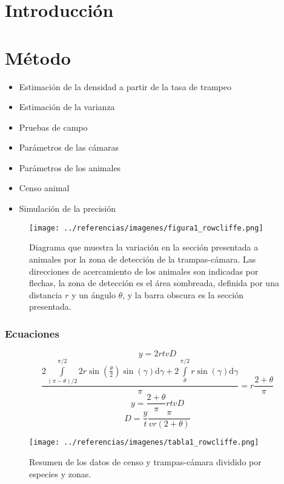 \section{Introducción}
\section{M\'etodo}
\begin{frame}
\begin{itemize}
  \item Estimaci\'on de la densidad a partir de la tasa de trampeo
  \item Estimaci\'on de la varianza
  \item Pruebas de campo
  \item Par\'ametros de las c\'amaras
  \item Par\'ametros de los animales
  \item Censo animal
  \item Simulaci\'on de la precisi\'on
\end{itemize}
\end{frame}
\begin{frame}
\begin{figure}[h]
\centering
\texttt{[image: ../referencias/imagenes/figura1\_rowcliffe.png]}
\caption{Diagrama que muestra la variaci\'on en la secci\'on presentada a
animales por la zona de detecci\'on de la trampas-c\'amara. Las direcciones de
acercamiento de los animales son indicadas por flechas, la zona de detecci\'on
es el \'area sombreada, definida por una distancia $r$ y un \'angulo $\theta$, y
la barra obscura es la secci\'on presentada.}
\end{figure}
\end{frame}
\begin{frame}
\frametitle{Ecuaciones}
$$y=2rtvD$$
$$\frac{2\int\limits^{\pi/2}_{(\pi-\theta)/2}2r\sin\left(\frac{\theta}{2}\right)
\sin \left(\gamma\right)\mbox{d}\gamma+2\int\limits^{\pi/2}_{\theta}r
\sin\left(\gamma\right)\mbox{d}\gamma}{\pi}=r\frac{2+\theta}{\pi}$$
$$y=\frac{2+\theta}{\pi}rtvD$$
$$D=\frac{y}{t}\frac{\pi}{vr(2+\theta)}$$
\end{frame}
\begin{frame}
\begin{figure}[h]
\centering
\texttt{[image: ../referencias/imagenes/tabla1\_rowcliffe.png]}
\caption{Resumen de los datos de censo y trampas-c\'amara dividido por especies
y zonas.}
\label{tabla1}
\end{figure}
\end{frame}

